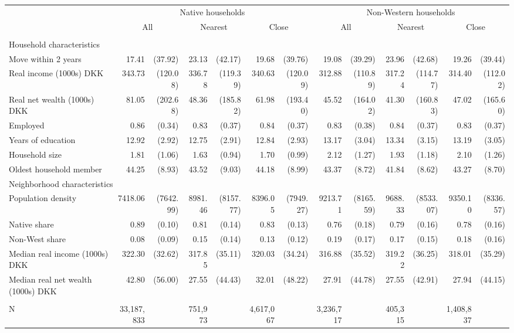 \begin{tabular}{lrrrrrrrrrrrr}
\toprule
 & \multicolumn{6}{c}{Native households} & \multicolumn{6}{c}{Non-Western households} \\ 
\cmidrule(lr){2-7} \cmidrule(lr){8-13}
 & \multicolumn{2}{c}{All} & \multicolumn{2}{c}{Nearest} & \multicolumn{2}{c}{Close} & \multicolumn{2}{c}{All} & \multicolumn{2}{c}{Nearest} & \multicolumn{2}{c}{Close} \\ 
\cmidrule(lr){2-3} \cmidrule(lr){4-5} \cmidrule(lr){6-7} \cmidrule(lr){8-9} \cmidrule(lr){10-11} \cmidrule(lr){12-13}
 &  &  &  &  &  &  &  &  &  &  &  &  \\ 
\midrule
\multicolumn{13}{l}{Household characteristics} \\ 
\midrule
Move within 2 years & 17.41 & (37.92) & 23.13 & (42.17) & 19.68 & (39.76) & 19.08 & (39.29) & 23.96 & (42.68) & 19.26 & (39.44) \\ 
Real income (1000s) DKK & 343.73 & (120.08) & 336.78 & (119.39) & 340.63 & (120.09) & 312.88 & (110.89) & 317.24 & (114.77) & 314.40 & (112.02) \\ 
Real net wealth (1000s) DKK & 81.05 & (202.68) & 48.36 & (185.82) & 61.98 & (193.40) & 45.52 & (164.02) & 41.30 & (160.83) & 47.02 & (165.60) \\ 
Employed & 0.86 & (0.34) & 0.83 & (0.37) & 0.84 & (0.37) & 0.83 & (0.38) & 0.84 & (0.37) & 0.83 & (0.37) \\ 
Years of education & 12.92 & (2.92) & 12.75 & (2.91) & 12.84 & (2.93) & 13.17 & (3.04) & 13.34 & (3.15) & 13.19 & (3.05) \\ 
Household size & 1.81 & (1.06) & 1.63 & (0.94) & 1.70 & (0.99) & 2.12 & (1.27) & 1.93 & (1.18) & 2.10 & (1.26) \\ 
Oldest household member & 44.25 & (8.93) & 43.52 & (9.03) & 44.18 & (8.99) & 43.37 & (8.72) & 41.84 & (8.62) & 43.27 & (8.70) \\ 
\midrule
\multicolumn{13}{l}{Neighborhood characteristics} \\ 
\midrule
Population density & 7418.06 & (7642.99) & 8981.46 & (8157.77) & 8396.05 & (7949.27) & 9213.71 & (8165.59) & 9688.33 & (8533.07) & 9350.10 & (8336.57) \\ 
Native share & 0.89 & (0.10) & 0.81 & (0.14) & 0.83 & (0.13) & 0.76 & (0.18) & 0.79 & (0.16) & 0.78 & (0.16) \\ 
Non-West share & 0.08 & (0.09) & 0.15 & (0.14) & 0.13 & (0.12) & 0.19 & (0.17) & 0.17 & (0.15) & 0.18 & (0.16) \\ 
Median real income (1000s) DKK & 322.30 & (32.62) & 317.85 & (35.11) & 320.03 & (34.24) & 316.88 & (35.52) & 319.22 & (36.25) & 318.01 & (35.29) \\ 
Median real net wealth (1000s) DKK & 42.80 & (56.00) & 27.55 & (44.43) & 32.01 & (48.22) & 27.91 & (44.78) & 27.55 & (42.91) & 27.94 & (44.15) \\ 
\midrule
\multicolumn{13}{l}{\vspace*{-5mm}} \\ 
N & 33,187,833 &  & 751,973 &  & 4,617,067 &  & 3,236,717 &  & 405,315 &  & 1,408,837 &  \\ 
\bottomrule
\end{tabular}
